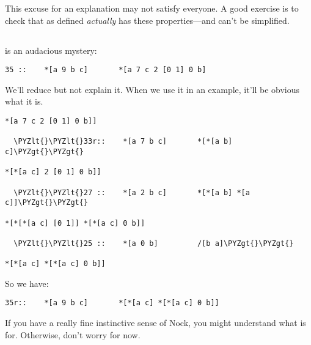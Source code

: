 This excuse for an explanation may not satisfy everyone.  A good
exercise is to check that  as defined \emph{actually} has these
properties---and can't be simplified.

\subsection{}

 is an audacious mystery:

\begin{framed_shaded}
\begin{Verbatim}[fontsize=\relsize{-2.5},fontseries=b,commandchars=\\\{\}]
35 ::    *[a 9 b c]       *[a 7 c 2 [0 1] 0 b]
\end{Verbatim}
\end{framed_shaded}
We'll reduce  but not explain it.  When we use it in an
example, it'll be obvious what it is.

\begin{framed_shaded}
\begin{Verbatim}[fontsize=\relsize{-2.5},fontseries=b,commandchars=\\\{\}]
*[a 7 c 2 [0 1] 0 b]]

  \PYZlt{}\PYZlt{}33r::    *[a 7 b c]       *[*[a b] c]\PYZgt{}\PYZgt{}

*[*[a c] 2 [0 1] 0 b]]
	
  \PYZlt{}\PYZlt{}27 ::    *[a 2 b c]       *[*[a b] *[a c]]\PYZgt{}\PYZgt{}

*[*[*[a c] [0 1]] *[*[a c] 0 b]]

  \PYZlt{}\PYZlt{}25 ::    *[a 0 b]         /[b a]\PYZgt{}\PYZgt{}

*[*[a c] *[*[a c] 0 b]]
\end{Verbatim}
\end{framed_shaded}
So we have:

\begin{framed_shaded}
\begin{Verbatim}[fontsize=\relsize{-2.5},fontseries=b,commandchars=\\\{\}]
35r::    *[a 9 b c]       *[*[a c] *[*[a c] 0 b]]
\end{Verbatim}
\end{framed_shaded}
If you have a really fine instinctive sense of Nock, you might
understand what  is for.  Otherwise, don't worry for now.